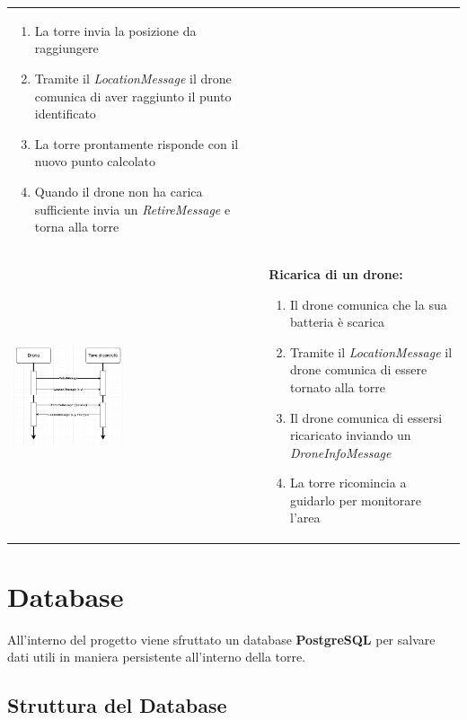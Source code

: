 \documentclass[a4paper, 11pt]{article}
\begin{document}
\begin{tabular}{m{} p{}}
    \begin{enumerate}
        \item La torre invia la posizione da raggiungere
        \item Tramite il \textit{LocationMessage} il drone comunica di aver raggiunto il punto identificato
        \item La torre prontamente risponde con il nuovo punto calcolato
        \item Quando il drone non ha carica sufficiente invia un \textit{RetireMessage} e torna alla torre
    \end{enumerate}\\
    \includegraphics[width=0.45\textwidth]{image/rechargingUML_MSC.png}&\textbf{Ricarica di un drone:}
    \begin{enumerate}
        \item Il drone comunica che la sua batteria è scarica 
        \item Tramite il \textit{LocationMessage} il drone comunica di essere tornato alla torre 
        \item Il drone comunica di essersi ricaricato inviando un \textit{DroneInfoMessage}
        \item La torre ricomincia a guidarlo per monitorare l'area
    \end{enumerate}

\end{tabular}
\newpage
\section{Database}

All'interno del progetto viene sfruttato un database \textbf{PostgreSQL} per salvare dati utili in maniera persistente all'interno della torre.

\subsection{Struttura del Database}
\end{document}
